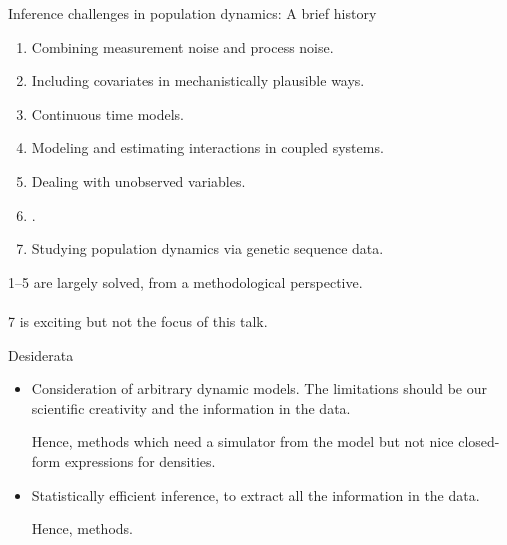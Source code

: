 \documentclass{beamer}
\begin{document}
\begin{frame}{Inference challenges in population dynamics: A brief history}

  \begin{enumerate}
\item Combining measurement noise and process noise.
\item Including covariates in mechanistically plausible ways.
\item  Continuous time models.
\item  Modeling and estimating interactions in coupled systems.
\item  Dealing with unobserved variables.
\item  {}.
\item  Studying population dynamics via genetic sequence data.
  \end{enumerate}

  \vspace{4mm}
  
  1--5 are largely solved, from a methodological perspective.\\
  \\
  7 is exciting but not the focus of this talk.


  \vspace{4mm}

  
\end{frame}

\begin{frame}{Desiderata}

  \begin{itemize}
    \item Consideration of arbitrary dynamic models. The limitations should be our scientific creativity and the information in the data.

      \vspace{2mm}
      
     Hence,  methods which need a simulator from the model but not nice closed-form expressions for densities.

     \vspace{2mm}
     
    \item Statistically efficient inference, to extract all the information in the data.

      \vspace{2mm}
      
    Hence,  methods.

      \end{itemize}
  \end{frame}
\end{document}
